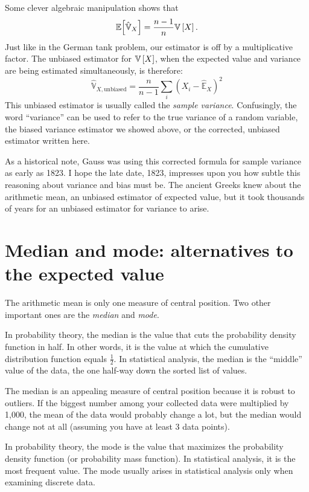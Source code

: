 Some clever algebraic manipulation shows that
\begin{equation}
\mathbb{E}\!\left[{\hat{\mathbb{V}}_X}\right] = \frac{n-1}{n} \mathbb{V}\left[{X}\right].
\end{equation}
Just like in the German tank problem, our estimator is off by a multiplicative factor. The unbiased estimator for $\mathbb{V}\left[{X}\right]$, when the expected value and variance are being estimated simultaneously, is therefore:
\begin{equation}
\hat{\mathbb{V}}_{X,\text{unbiased}} = \frac{n}{n - 1} \sum_i \left( X_i - \hat{\mathbb{E}}_X \right)^2
\end{equation}
This unbiased estimator is usually called the \emph{sample variance}.
Confusingly, the word ``variance'' can be used to refer to the true variance
of a random variable, the biased variance estimator we showed above, or the
corrected, unbiased estimator written here.

As a historical note, Gauss was using this corrected formula for sample
variance as early as 1823. I hope the late date, 1823, impresses upon you how
subtle this reasoning about variance and bias must be. The ancient Greeks knew
about the arithmetic mean, an unbiased estimator of expected value, but it took
thousands of years for an unbiased estimator for variance to arise.

\section{Median and mode: alternatives to the expected value}

The arithmetic mean is only one measure of central position. Two other
important ones are the \emph{median} and \emph{mode}.

In probability theory, the median is the value that cuts the probability
density function in half. In other words, it is the value at which the
cumulative distribution function equals $\tfrac{1}{2}$. In statistical
analysis, the median is the ``middle'' value of the data, the one half-way
down the sorted list of values.

The median is an appealing measure of central position because it is robust to
outliers. If the biggest number among your collected data were multiplied by
1,000, the mean of the data would probably change a lot, but the median would
change not at all (assuming you have at least 3 data points).

In probability theory, the mode is the value that maximizes the probability
density function (or probability mass function). In statistical analysis, it
is the most frequent value. The mode usually arises in statistical analysis
only when examining discrete data.
